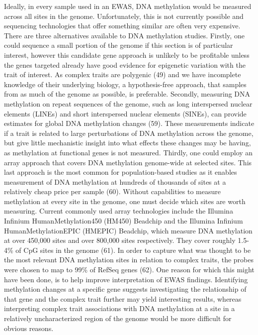 \documentclass[11pt,oneside]{bristolthesis}
\begin{document}
Ideally, in every sample used in an EWAS, DNA methylation would be measured across all sites in the genome. Unfortunately, this is not currently possible and sequencing technologies that offer something similar are often very expensive. There are three alternatives available to DNA methylation studies. Firstly, one could sequence a small portion of the genome if this section is of particular interest, however this candidate gene approach is unlikely to be profitable unless the genes targeted already have good evidence for epigenetic variation with the trait of interest. As complex traits are polygenic (49) and we have incomplete knowledge of their underlying biology, a hypothesis-free approach, that samples from as much of the genome as possible, is preferable. Secondly, measuring DNA methylation on repeat sequences of the genome, such as long interspersed nuclear elements (LINEs) and short interspersed nuclear elements (SINEs), can provide estimates for global DNA methylation changes (59). These measurements indicate if a trait is related to large perturbations of DNA methylation across the genome, but give little mechanistic insight into what effects these changes may be having, as methylation at functional genes is not measured. Thirdly, one could employ an array approach that covers DNA methylation genome-wide at selected sites. This last approach is the most common for population-based studies as it enables measurement of DNA methylation at hundreds of thousands of sites at a relatively cheap price per sample (60). Without capabilities to measure methylation at every site in the genome, one must decide which sites are worth measuring. Current commonly used array technologies include the Illumina Infinium HumanMethylation450 (HM450) Beadchip and the Illumina Infinium HumanMethylationEPIC (HMEPIC) Beadchip, which measure DNA methylation at over 450,000 sites and over 800,000 sites respectively. They cover roughly 1.5-4\% of CpG sites in the genome (61). In order to capture what was thought to be the most relevant DNA methylation sites in relation to complex traits, the probes were chosen to map to 99\% of RefSeq genes (62). One reason for which this might have been done, is to help improve interpretation of EWAS findings. Identifying methylation changes at a specific gene suggests investigating the relationship of that gene and the complex trait further may yield interesting results, whereas interpreting complex trait associations with DNA methylation at a site in a relatively uncharacterized region of the genome would be more difficult for obvious reasons.
\end{document}
